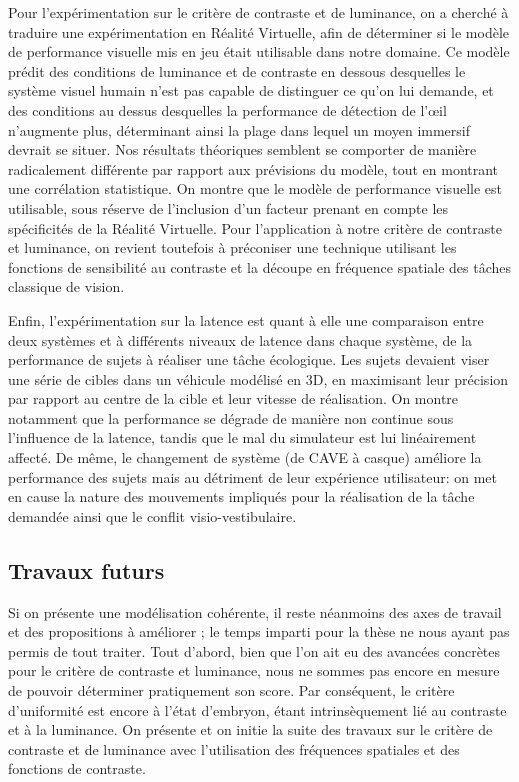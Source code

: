 	\par Pour l'expérimentation sur le critère de contraste et de luminance, on a cherché à traduire une expérimentation en Réalité Virtuelle, afin de déterminer si le modèle de performance visuelle mis en jeu était utilisable dans notre domaine. Ce modèle prédit des conditions de luminance et de contraste en dessous desquelles le système visuel humain n'est pas capable de distinguer ce qu'on lui demande, et des conditions au dessus desquelles la performance de détection de l'œil n'augmente plus, déterminant ainsi la plage dans lequel un moyen immersif devrait se situer. Nos résultats théoriques semblent se comporter de manière radicalement différente par rapport aux prévisions du modèle, tout en montrant une corrélation statistique. On montre que le modèle de performance visuelle est utilisable, sous réserve de l'inclusion d'un facteur prenant en compte les spécificités de la Réalité Virtuelle. Pour l'application à notre critère de contraste et luminance, on revient toutefois à préconiser une technique utilisant les fonctions de sensibilité au contraste et la découpe en fréquence spatiale des tâches classique de vision.
	
	\par Enfin, l'expérimentation sur la latence est quant à elle une comparaison entre deux systèmes et à différents niveaux de latence dans chaque système, de la performance de sujets à réaliser une tâche écologique. Les sujets devaient viser une série de cibles dans un véhicule modélisé en 3D, en maximisant leur précision par rapport au centre de la cible et leur vitesse de réalisation. On montre notamment que la performance se dégrade de manière non continue sous l'influence de la latence, tandis que le mal du simulateur est lui linéairement affecté. De même, le changement de système (de CAVE à casque) améliore la performance des sujets mais au détriment de leur expérience utilisateur: on met en cause la nature des mouvements impliqués pour la réalisation de la tâche demandée ainsi que le conflit visio-vestibulaire.

	\subsection*{Travaux futurs}
	\par Si on présente une modélisation cohérente, il reste néanmoins des axes de travail et des propositions à améliorer ; le temps imparti pour la thèse ne nous ayant pas permis de tout traiter. Tout d'abord, bien que l'on ait eu des avancées concrètes pour le critère de contraste et luminance, nous ne sommes pas encore en mesure de pouvoir déterminer pratiquement son score. Par conséquent, le critère d'uniformité est encore à l'état d'embryon, étant intrinsèquement lié au contraste et à la luminance. On présente et on initie la suite des travaux sur le critère de contraste et de luminance avec l'utilisation des fréquences spatiales et des fonctions de contraste.
	
